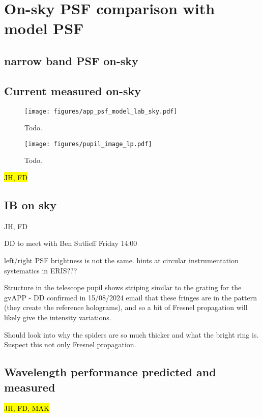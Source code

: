 \documentclass{aa}
\begin{document}
\section{On-sky PSF comparison with model PSF}


\subsection{narrow band PSF on-sky}

\subsection{Current measured on-sky}

\begin{figure*}
    \centering
    \texttt{[image: figures/app\_psf\_model\_lab\_sky.pdf]}
    \caption{Todo.}
    \label{fig:app_psf_comp}
\end{figure*}

\begin{figure}
    \centering
    \texttt{[image: figures/pupil\_image\_lp.pdf]}
    \caption{Todo.}
    \label{fig:lprime_cc}
\end{figure}

\hl{JH, FD}

\subsection{IB on sky}

JH, FD

DD to meet with Ben Sutlieff Friday 14:00

left/right PSF brightness is not the same. hints at circular instrumentation systematics in ERIS???

Structure in the telescope pupil shows striping similar to the grating for the gvAPP - DD confirmed in 15/08/2024 email that these fringes are in the pattern (they create the reference holograms), and so a bit of Fresnel propagation will likely give the intensity variations.

Should look into why the spiders are so much thicker and what the bright ring is. Suspect this not only Fresnel propagation.

\subsection{Wavelength performance predicted and measured}
\hl{JH, FD, MAK}
\end{document}
